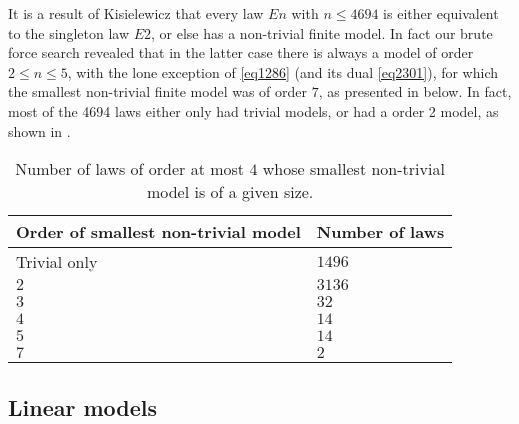 
It is a result of Kisielewicz \cite{Kisielewicz} that every law $En$ with $n \leq 4694$ is either equivalent to the singleton law $E2$, or else has a non-trivial finite model.  In fact our brute force search revealed that in the latter case there is always a model of order $2 \leq n \leq 5$, with the lone exception of \eqref{eq1286} (and its dual \eqref{eq2301}), for which the smallest non-trivial finite model was of order $7$, as presented in  below.  In fact, most of the 4694 laws either only had trivial models, or had a order 2 model, as shown in .
\begin{table}
\centering
\begin{tabular}{ll}
  \hline
Order of smallest non-trivial model & Number of laws \\
\hline
Trivial only & $1496$ \\
$2$ & $3136$ \\
$3$ & $32$ \\
$4$ & $14$ \\
$5$ & $14$ \\
$7$ & $2$\\
\hline
\end{tabular}
\caption{Number of laws of order at most $4$ whose smallest non-trivial model is of a given size.}\label{size-table}
\end{table}
\subsection{Linear models}\label{linear-sec}

